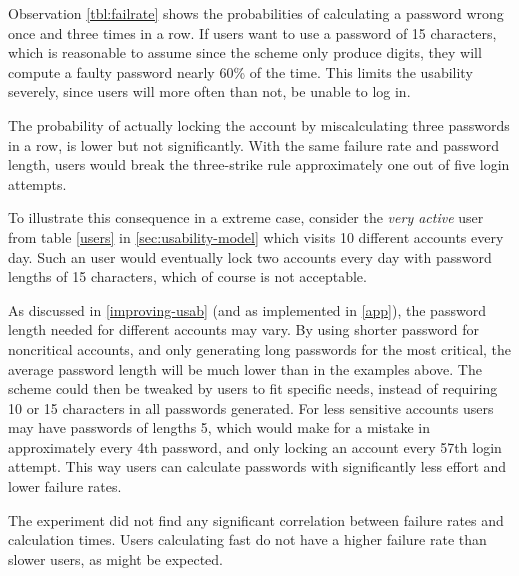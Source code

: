 \par Observation \ref{tbl:failrate} shows the probabilities of calculating a password wrong once and three times in a row. If users want to use a password of 15 characters, which is reasonable to assume since the scheme only produce digits, they will compute a faulty password nearly 60\% of the time. This limits the usability severely, since users will more often than not, be unable to log in.
\par The probability of actually locking the account by miscalculating three passwords in a row, is lower but not significantly. With the same failure rate and password length, users would break the three-strike rule approximately one out of five login attempts.

\par To illustrate this consequence in a extreme case, consider the \emph{very active} user from table \ref{users} in \autoref{sec:usability-model} which visits 10 different accounts every day. Such an user would eventually lock two accounts every day with password lengths of 15 characters, which of course is not acceptable.

\par As discussed in \autoref{improving-usab} (and as implemented in \autoref{app}), the password length needed for different accounts may vary. By using shorter password for noncritical accounts, and only generating long passwords for the most critical, the average password length will be much lower than in the examples above. The scheme could then be tweaked by users to fit specific needs, instead of requiring 10 or 15 characters in all passwords generated. For less sensitive accounts users may have passwords of lengths 5, which would make for a mistake in approximately every 4th password, and only locking an account every 57th login attempt. This way users can calculate passwords with significantly less effort and lower failure rates. 

\par The experiment did not find any significant correlation between failure rates and calculation times. Users calculating fast do not have a higher failure rate than slower users, as might be expected. 

